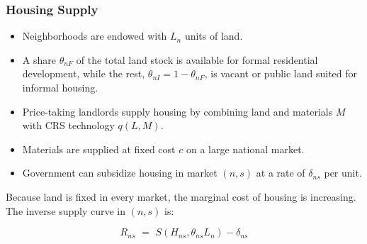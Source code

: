 \documentclass[aspectratio=149]{beamer}
\begin{document}
\begin{frame}
\frametitle{Housing Supply}

\begin{itemize}
  \item Neighborhoods are endowed with $L_n$ units of land.
  \item A share $\theta_{nF}$ of the total land stock is available for formal residential development, while the rest, $\theta_{nI} = 1-\theta_{nF}$, is vacant or public land suited for informal housing.
  \item Price-taking landlords supply housing by combining land and materials $M$ with CRS technology $q(L,M)$.
  \item Materials are supplied at fixed cost $c$ on a large national market.
  \item Government can subsidize housing in market $(n,s)$ at a rate of $\delta_{ns}$ per unit.
\end{itemize}

Because land is fixed in every market, the marginal cost of housing is increasing. The inverse supply curve in $(n,s)$ is:

\begin{equation*}
R_{ns} \,\, =\,\, S(H_{ns},\theta_{ns}L_n) - \delta_{ns}
\end{equation*} 

\vspace{4mm}

\end{frame}

\end{document}
